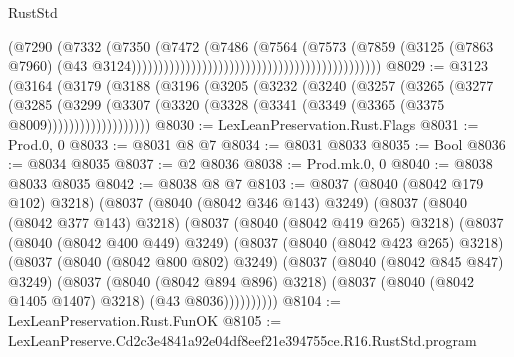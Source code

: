 \begin{lexlean}{RustStd}
\begin{coremodule}
                                                                            (@7290
                                                                              (@7332
                                                                                (@7350
                                                                                  (@7472
                                                                                    (@7486
                                                                                      (@7564
                                                                                        (@7573
                                                                                          (@7859
                                                                                            (@3125
                                                                                              (@7863
                                                                                                @7960)
                                                                                              (@43
                                                                                                @3124))))))))))))))))))))))))))))))))))))))))))))))
@8029 := @3123
    (@3164
      (@3179
        (@3188
          (@3196
            (@3205
              (@3232
                (@3240
                  (@3257
                    (@3265
                      (@3277
                        (@3285
                          (@3299
                            (@3307
                              (@3320 (@3328 (@3341 (@3349 (@3365 (@3375 @8009)))))))))))))))))))
@8030 := LexLeanPreservation.Rust.Flags
@8031 := Prod.{0, 0}
@8033 := @8031 @8 @7
@8034 := @8031 @8033
@8035 := Bool
@8036 := @8034 @8035
@8037 := @2 @8036
@8038 := Prod.mk.{0, 0}
@8040 := @8038 @8033 @8035
@8042 := @8038 @8 @7
@8103 := @8037
    (@8040 (@8042 @179 @102) @3218)
    (@8037
      (@8040 (@8042 @346 @143) @3249)
      (@8037
        (@8040 (@8042 @377 @143) @3218)
        (@8037
          (@8040 (@8042 @419 @265) @3218)
          (@8037
            (@8040 (@8042 @400 @449) @3249)
            (@8037
              (@8040 (@8042 @423 @265) @3218)
              (@8037
                (@8040 (@8042 @800 @802) @3249)
                (@8037
                  (@8040 (@8042 @845 @847) @3249)
                  (@8037
                    (@8040 (@8042 @894 @896) @3218)
                    (@8037 (@8040 (@8042 @1405 @1407) @3218) (@43 @8036))))))))))
@8104 := LexLeanPreservation.Rust.FunOK
@8105 := LexLeanPreserve.Cd2c3e4841a92e04df8eef21e394755ce.R16.RustStd.program

\end{coremodule}
\end{lexlean}

